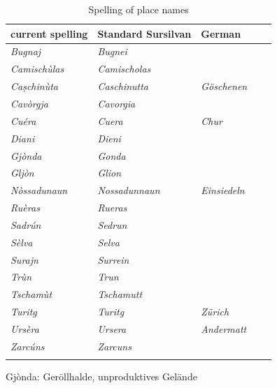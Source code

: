 \begin{table}
	\caption{Spelling of place names}
	\label{spellpln}
	\begin{tabular}{lllll}
\lsptoprule
current spelling &  Standard Sursilvan & German\\
\midrule
\textit{Bugnaj} & \textit{Bugnei}\\
\textit{Camischùlas} & \textit{Camischolas}\\
\textit{Caṣchinùta} & \textit{Caschinutta} & \textit{Göschenen}\\
\textit{Cavòrgja} & \textit{Cavorgia}\\
\textit{Cuéra} & \textit{Cuera} & \textit{Chur}\\
\textit{Diani} & \textit{Dieni}\\
\textit{Gjònda} & \textit{Gonda}\\
\textit{Gljòn} & \textit{Glion}\\
\textit{Nòssadunaun} & \textit{Nossadunnaun} & \textit{Einsiedeln}\\
\textit{Ruèras} & \textit{Rueras}\\
\textit{Sadrún} & \textit{Sedrun}\\
\textit{Sèlva} & \textit{Selva}\\
\textit{Surajn} & \textit{Surrein}\\
\textit{Trùn} & \textit{Trun}\\
\textit{Tschamùt} & \textit{Tschamutt}\\
\textit{Turitg} & \textit{Turitg} & \textit{Zürich}\\
\textit{Ursèra} & \textit{Ursera} & \textit{Andermatt}\\
\textit{Zarcúns} & \textit{Zarcuns}\\
\lspbottomrule
\end{tabular}
\end{table}

Gjònda: Geröllhalde, unproduktives Gelände
